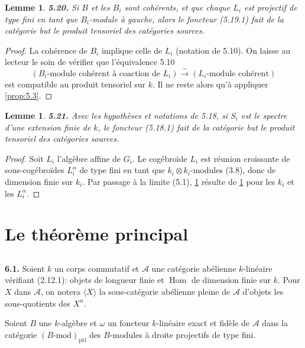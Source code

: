 \documentclass[12pt,a4paper]{article}
\theoremstyle{plain}
\newtheorem{lemma}[theorem]{Lemme}
\theoremstyle{definition}
\theoremstyle{remark}
\DeclareMathOperator{\Hom}{Hom}
\begin{document}
\begin{lemma}\label{lem:5.20}
\textbf{5.20.} Si $B$ et les $B_i$ sont cohérents, et que chaque $L_i$ est projectif de type fini en tant que $B_i$-module à gauche, alors le foncteur (5.19.1) fait de la catégorie but le produit tensoriel des catégories sources.
\end{lemma}

\begin{proof}
La cohérence de $B_i$ implique celle de $L_i$ (notation de 5.10). On laisse au lecteur le soin de vérifier que l'équivalence 5.10
\[
(B_i\text{-module cohérent à coaction de } L_i) \xrightarrow{\sim} (L_i\text{-module cohérent})
\]
est compatible au produit tensoriel sur $k$. Il ne reste alors qu'à appliquer \ref{prop:5.3}.
\end{proof}

\begin{lemma}\label{lem:5.21}
\textbf{5.21.} Avec les hypothèses et notations de 5.18, si $S_i$ est le spectre d'une extension finie de $k$, le foncteur (5.18.1) fait de la catégorie but le produit tensoriel des catégories sources.
\end{lemma}

\begin{proof}
Soit $L_i$ l'algèbre affine de $G_i$. Le cogébroïde $L_i$ est réunion croissante de sous-cogébroïdes $L_i^\alpha$ de type fini en tant que $k_i \otimes k_i$-modules (3.8), donc de dimension finie sur $k_i$. Par passage à la limite (5.1), \ref{lem:5.21} résulte de \ref{lem:5.20} pour les $k_i$ et les $L_i^\alpha$.
\end{proof}


\section{Le théorème principal}

\subsection{}

\textbf{6.1.} Soient $k$ un corps commutatif et $\mathcal{A}$ une catégorie abélienne $k$-linéaire vérifiant (2.12.1): objets de longueur finie et $\Hom$ de dimension finie sur $k$. Pour $X$ dans $\mathcal{A}$, on notera $\langle X \rangle$ la sous-catégorie abélienne pleine de $\mathcal{A}$ d'objets les sous-quotients des $X^n$.

Soient $B$ une $k$-algèbre et $\omega$ un foncteur $k$-linéaire exact et fidèle de $\mathcal{A}$ dans la catégorie $(B\text{-mod})_\mathrm{ptf}$ des $B$-modules à droite projectifs de type fini.
\end{document}
